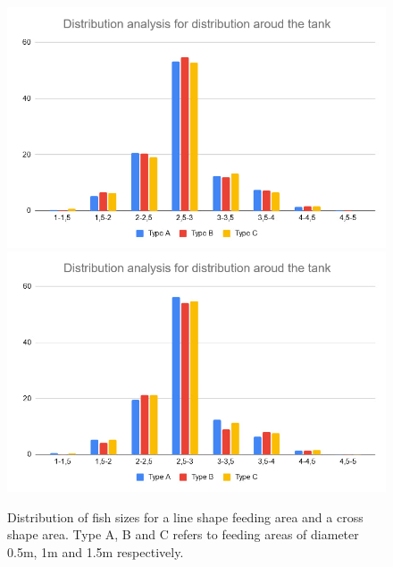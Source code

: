 \documentclass[9pt]{pnas-new}
\begin{document}
\begin{figure}[h]
    \centering
    \includegraphics[width=(2in+\columnwidth)/3]{fig/graph_line.jpg}
    \hfill
    \includegraphics[width=(2in+\columnwidth)/3]{fig/graph_cross.jpg}
    \caption{Distribution of fish sizes for a line shape feeding area and a cross shape area. Type A, B and C refers to feeding areas of diameter 0.5m, 1m and 1.5m respectively.}
    \label{fig:results}
\end{figure}
\end{document}
